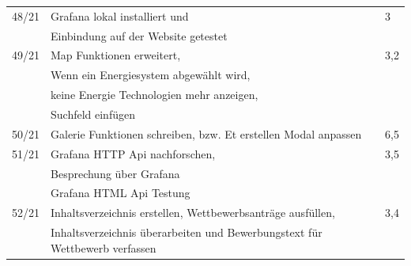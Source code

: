 \begin{table}[h]
\begin{tabular}{|l|lll|}
		48/21 &
		\multicolumn{2}{l|}{Grafana lokal installiert und } &
		3 \\&Einbindung auf der Website getestet\\ \hline
		49/21 &
		\multicolumn{2}{l|}{Map Funktionen erweitert,  } &
		3,2 \\ & Wenn ein Energiesystem abgewählt wird,\\&keine Energie Technologien mehr anzeigen,\\&Suchfeld einfügen\\\hline
		50/21 &
		\multicolumn{2}{l|}{Galerie Funktionen schreiben, bzw. Et erstellen Modal anpassen} &
		6,5 \\ \hline
		51/21 &
		\multicolumn{2}{l|}{Grafana HTTP Api nachforschen,   } &
		3,5 \\ &Besprechung über Grafana\\&Grafana HTML Api Testung\\\hline
		52/21 &
		\multicolumn{2}{l|}{Inhaltsverzeichnis erstellen, Wettbewerbsanträge ausfüllen, } &
		3,4 \\&Inhaltsverzeichnis überarbeiten und Bewerbungstext für Wettbewerb verfassen\\ \hline
		
	\end{tabular}
\end{table}
\newpage
